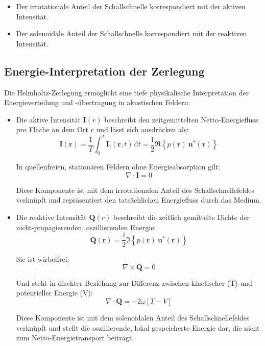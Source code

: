 \begin{itemize}
\item Der irrotationale Anteil der Schallschnelle korrespondiert mit der aktiven Intensität.
\item Der solenoidale Anteil der Schallschnelle korrespondiert mit der reaktiven Intensität.
\end{itemize}

\subsection{Energie-Interpretation der Zerlegung}
 
Die Helmholtz-Zerlegung ermöglicht eine tiefe physikalische Interpretation der Energieverteilung und -übertragung in akustischen Feldern:
 
\begin{itemize}
\item Die aktive Intensität $\mathbf{I}(r)$ beschreibt den zeitgemittelten Netto-Energiefluss pro Fläche an dem Ort $r$ und lässt sich ausdrücken als:
\begin{equation}
\mathbf{I}(\mathbf{r}) = \frac{1}{T}\int_0^T \mathbf{I}_i(\mathbf{r},t)\,\mathrm{d}t = \frac{1}{2}\Re\left\{p(\mathbf{r})~\mathbf{u}^*(\mathbf{r})\right\}
\end{equation}
 
In quellenfreien, stationären Feldern ohne Energieabsorption gilt:
\begin{equation}
\nabla \cdot \mathbf{I} = 0
\end{equation}
 
Diese Komponente ist mit dem irrotationalen Anteil des Schallschnellefeldes verknüpft und repräsentiert den tatsächlichen Energiefluss durch das Medium.
 
\item Die reaktive Intensität $\mathbf{Q}(r)$ beschreibt die zeitlich gemittelte Dichte der nicht-propagierenden, oszillierenden Energie:
\begin{equation}
\mathbf{Q}(\mathbf{r}) = \frac{1}{2}\Im\left\{p(\mathbf{r})~\mathbf{u}^*(\mathbf{r})\right\}
\end{equation}
 
Sie ist wirbelfrei:
\begin{equation}
\nabla \times \mathbf{Q} = 0
\end{equation}
 
Und steht in direkter Beziehung zur Differenz zwischen kinetischer (T) und potentieller Energie (V):
\begin{equation}
\nabla \cdot \mathbf{Q} = -2 \omega [T-V]
\end{equation}
 
Diese Komponente ist mit dem solenoidalen Anteil des Schallschnellefeldes verknüpft und stellt die oszillierende, lokal gespeicherte Energie dar, die nicht zum Netto-Energietransport beiträgt.
\end{itemize}
 
